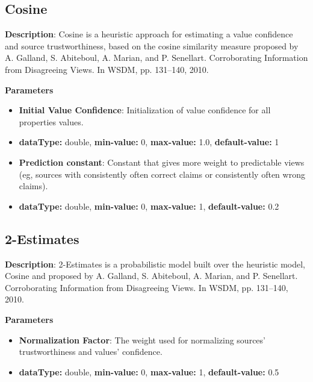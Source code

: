 \documentclass[a4paper,10pt]{scrartcl}
\begin{document}
\subsection{Cosine}
\begin{description}
\item \textbf{Description}: Cosine is a heuristic approach for estimating a value confidence and source trustworthiness, based on the cosine similarity measure proposed by A. Galland, S. Abiteboul, A. Marian, and P. Senellart. Corroborating Information from Disagreeing Views. In WSDM, pp. 131–140, 2010.
\item \textbf{Parameters}
\begin{itemize}
\item \textbf{Initial Value Confidence}: Initialization of value confidence for all properties values.
\item[]\textbf{dataType: }double, \textbf{min-value: }0, \textbf{max-value: }1.0, \textbf{default-value: }1\item \textbf{Prediction constant}: Constant that gives more weight to predictable views (eg, sources with consistently often correct claims or consistently often wrong claims).
\item[]\textbf{dataType: }double, \textbf{min-value: }0, \textbf{max-value: }1, \textbf{default-value: }0.2\end{itemize}
\end{description}
\subsection{2-Estimates}
\begin{description}
\item \textbf{Description}: 2-Estimates is a probabilistic model built over the heuristic model, Cosine and proposed by A. Galland, S. Abiteboul, A. Marian, and P. Senellart. Corroborating Information from Disagreeing Views. In WSDM, pp. 131–140, 2010.
\item \textbf{Parameters}
\begin{itemize}
\item \textbf{Normalization Factor}: The weight used for normalizing sources' trustworthiness and values' confidence.
\item[]\textbf{dataType: }double, \textbf{min-value: }0, \textbf{max-value: }1, \textbf{default-value: }0.5\end{itemize}
\end{description}
\end{document}
